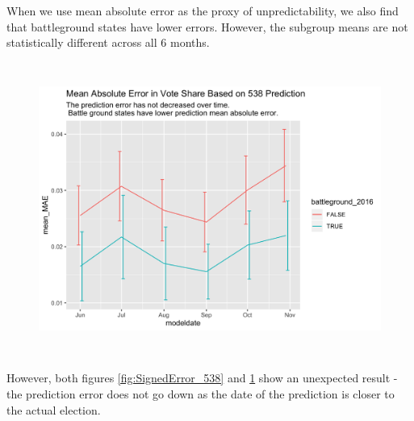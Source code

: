 When we use mean absolute error as the proxy of unpredictability, we also find that battleground states have lower errors. However, the subgroup means are not statistically different across all 6 months.

\begin{figure}[H]
    \centering
    \includegraphics[height=26em]{figures/SummaryMAE_538.png}
    \caption{}
    \label{fig:SummaryMAE_538}
\end{figure}

However, both figures \ref{fig:SignedError_538} and \ref{fig:SummaryMAE_538} show an unexpected result - the prediction error does not go down as the date of the prediction is closer to the actual election.


